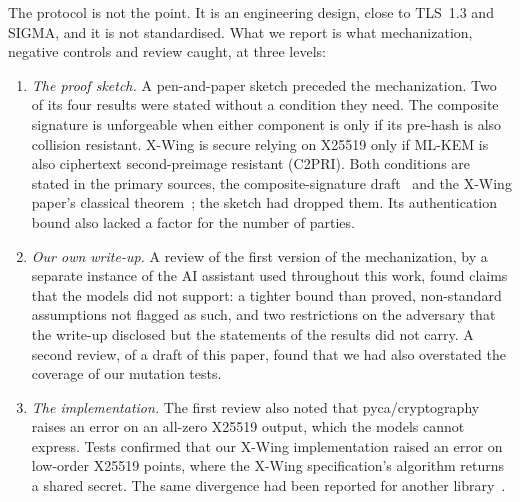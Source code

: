 The protocol is not the point. It is an engineering design, close to TLS~1.3
and SIGMA, and it is not standardised. What we report is what mechanization,
negative controls and review caught, at three levels:
\begin{enumerate}
  \item \emph{The proof sketch.} A pen-and-paper sketch preceded the
  mechanization. Two of its four results were stated without a condition
  they need. The composite signature is unforgeable when either component is
  only if its pre-hash is also collision resistant. X-Wing is secure relying
  on X25519 only if ML-KEM is also ciphertext second-preimage resistant
  (C2PRI). Both conditions are stated in the primary sources, the
  composite-signature draft~\cite{Composite} and the X-Wing paper's
  classical theorem~\cite{XWing}; the sketch had dropped them. Its
  authentication bound also lacked a factor for the number of parties.
  \item \emph{Our own write-up.} A review of the first version of the
  mechanization, by a separate instance of the AI assistant used throughout
  this work, found claims that the models did not support: a tighter bound
  than proved, non-standard assumptions not flagged as such, and two
  restrictions on the adversary that the write-up disclosed but the
  statements of the results did not carry. A second review, of a draft of this paper,
  found that we had also overstated the coverage of our mutation tests.
  \item \emph{The implementation.} The first review also noted that
  pyca/cryptography raises an error on an all-zero X25519 output, which the
  models cannot express. Tests confirmed that our X-Wing implementation
  raised an error on low-order X25519 points, where the X-Wing
  specification's algorithm returns a shared secret. The same divergence had
  been reported for another library~\cite{Noble26}.
\end{enumerate}

